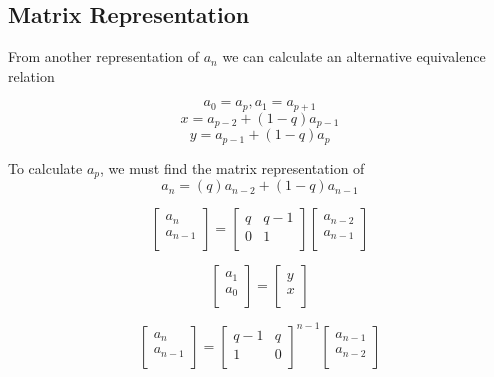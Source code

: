 \documentclass[paper.tex]{subfiles}
\begin{document}
\subsection{Matrix Representation}

From another representation of $a_{n}$ we can calculate an alternative equivalence relation

$$a_{0} = a_{p}, a_{1} = a_{p+1}$$
$$x = a_{p-2} + (1-q)a_{p-1}$$
$$ y = a_{p-1} + (1-q)a_{p}$$

To calculate $a_{p}$, we must find the matrix representation of 
$$ a_{n} = (q)a_{n-2} + (1-q)a_{n-1} $$



\[ 
\left[ \begin{array}{ccc}
a_{n} \\
a_{n-1} \\
\end{array} \right] 
=
\left[ \begin{array}{ccc}
q & q-1 \\
0 & 1 \\
\end{array} \right]
\left[ \begin{array}{ccc}
 a_{n-2}\\
a_{n-1} \\
\end{array} \right]
\] 

\[ 
\left[ \begin{array}{ccc}
a_{1} \\
a_{0} \\
\end{array} \right] 
=
\left[ \begin{array}{ccc}
y \\
x \\
\end{array} \right]
\] 

\[ 
\left[ \begin{array}{ccc}
a_{n} \\
a_{n-1} \\
\end{array} \right] 
=
\left[ \begin{array}{ccc}
q-1 & q \\
1 & 0 \\
\end{array} \right] ^{n-1}
\left[ \begin{array}{ccc}
 a_{n-1}\\
a_{n-2} \\
\end{array} \right]
\] 
\end{document}
